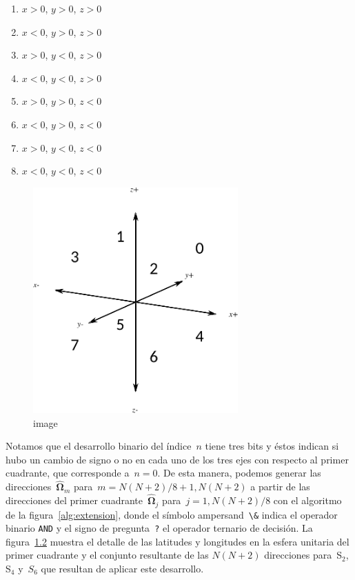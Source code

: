 \documentclass[
  12pt,
  a4paper,
  table]{scrbook}
\newcommand{\passthrough}[1]{#1}
\providecommand{\tightlist}{%
  \setlength{\itemsep}{0pt}\setlength{\parskip}{0pt}}\usepackage{longtable,booktabs,array}
\theoremstyle{plain}
\theoremstyle{definition}
\theoremstyle{plain}
\theoremstyle{plain}
\theoremstyle{remark}
\begin{document}
\begin{enumerate}
\def\labelenumi{\arabic{enumi}.}
\setcounter{enumi}{-1}
\tightlist
\item
  \(x>0\), \(y>0\), \(z>0\)
\item
  \(x<0\), \(y>0\), \(z>0\)
\item
  \(x>0\), \(y<0\), \(z>0\)
\item
  \(x<0\), \(y<0\), \(z>0\)
\item
  \(x>0\), \(y>0\), \(z<0\)
\item
  \(x<0\), \(y>0\), \(z<0\)
\item
  \(x>0\), \(y<0\), \(z<0\)
\item
  \(x<0\), \(y<0\), \(z<0\)
\end{enumerate}

\begin{figure}

{\centering \includegraphics[width=0.7\textwidth,height=\textheight]{040-discretizacion/axes-with-octs.pdf}

}

\caption{image}

\end{figure}

Notamos que el desarrollo binario del índice~\(n\) tiene tres bits y
éstos indican si hubo un cambio de signo o no en cada uno de los tres
ejes con respecto al primer cuadrante, que corresponde a~\(n=0\). De
esta manera, podemos generar las
direcciones~\(\boldsymbol{\hat{\Omega}}_m\)
para~\(m=N(N+2)/8+1, N(N+2)\) a partir de las direcciones del primer
cuadrante~\(\boldsymbol{\hat{\Omega}}_j\) para~\(j=1,N(N+2)/8\) con el
algoritmo de la
figura~\protect\hyperlink{alg:extension}{{[}alg:extension{]}}, donde el
símbolo ampersand~\passthrough{\lstinline!\&!} indica el operador
binario \passthrough{\lstinline!AND!} y el signo de
pregunta~\passthrough{\lstinline!?!} el operador ternario de decisión.
La figura~\protect\hyperlink{fig:latsn}{1.2} muestra el detalle de las
latitudes y longitudes en la esfera unitaria del primer cuadrante y el
conjunto resultante de las \(N(N+2)\) direcciones para~S\(_2\), S\(_4\)
y~\(S_6\) que resultan de aplicar este desarrollo.
\end{document}

